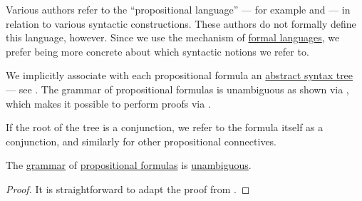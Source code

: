 \begin{comments}
  \item Various authors refer to the \enquote{propositional language} --- for example  and  --- in relation to various syntactic constructions. These authors do not formally define this language, however. Since we use the mechanism of \hyperref[def:formal_language]{formal languages}, we prefer being more concrete about which syntactic notions we refer to.

  \item We implicitly associate with each propositional formula an \hyperref[con:abstract_syntax_tree]{abstract syntax tree} --- see . The grammar of propositional formulas is unambiguous as shown via , which makes it possible to perform proofs via .

  \item If the root of the tree is a conjunction, we refer to the formula itself as a conjunction, and similarly for other propositional connectives.
\end{comments}

\begin{proposition}\label{thm:propositional_formulas_are_unambiguous}
  The \hyperref[def:formal_grammar]{grammar} of \hyperref[def:propositional_syntax/formula]{propositional formulas} is \hyperref[def:grammar_ambiguity]{unambiguous}.
\end{proposition}
\begin{proof}
  It is straightforward to adapt the proof from .
\end{proof}

